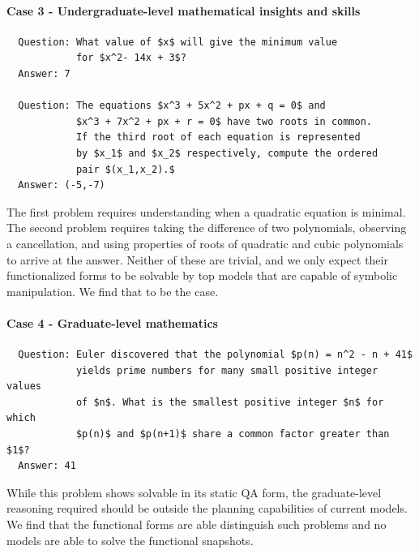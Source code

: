 \documentclass[11pt,a4paper]{article}
\begin{document}
\paragraph{Case 3 - Undergraduate-level mathematical insights and skills}
\begin{verbatim}
  Question: What value of $x$ will give the minimum value
            for $x^2- 14x + 3$?
  Answer: 7

  Question: The equations $x^3 + 5x^2 + px + q = 0$ and
            $x^3 + 7x^2 + px + r = 0$ have two roots in common.
            If the third root of each equation is represented
            by $x_1$ and $x_2$ respectively, compute the ordered
            pair $(x_1,x_2).$
  Answer: (-5,-7)
\end{verbatim}
The first problem requires understanding when a quadratic equation is
minimal.  The second problem requires taking the difference of two polynomials,
observing a cancellation, and using properties of roots of quadratic and cubic
polynomials to arrive at the answer.  Neither of these are trivial, and we only
expect their functionalized forms to be solvable by top models that are capable
of symbolic manipulation.  We find that to be the case.

\paragraph{Case 4 - Graduate-level mathematics}
\begin{verbatim}
  Question: Euler discovered that the polynomial $p(n) = n^2 - n + 41$
            yields prime numbers for many small positive integer values
            of $n$. What is the smallest positive integer $n$ for which
            $p(n)$ and $p(n+1)$ share a common factor greater than $1$?
  Answer: 41
\end{verbatim}
While this problem shows solvable in its static QA form, the
graduate-level reasoning required should be outside the planning capabilities of
current models. We find that the functional forms are able distinguish such
problems and no models are able to solve the functional snapshots.
\end{document}
